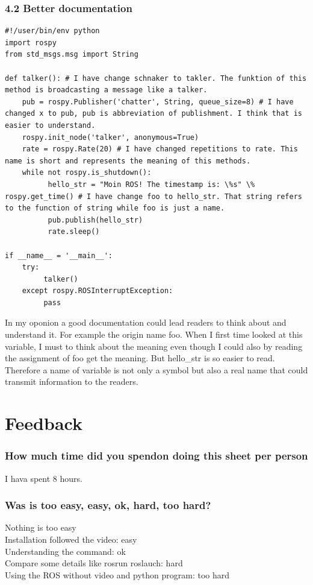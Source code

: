 \documentclass{ROS}
\begin{document}
\subsubsection*{4.2 Better documentation}
\begin{lstlisting}[firstnumber=1]
#!/user/bin/env python 
import rospy 
from std_msgs.msg import String

def talker(): # I have change schnaker to takler. The funktion of this method is broadcasting a message like a talker.
    pub = rospy.Publisher('chatter', String, queue_size=8) # I have changed x to pub, pub is abbreviation of publishment. I think that is easier to understand.
    rospy.init_node('talker', anonymous=True)
    rate = rospy.Rate(20) # I have changed repetitions to rate. This name is short and represents the meaning of this methods.
    while not rospy.is_shutdown():
          hello_str = "Moin ROS! The timestamp is: \%s" \% rospy.get_time() # I have change foo to hello_str. That string refers to the function of string while foo is just a name.  
          pub.publish(hello_str)
          rate.sleep()

if __name__ = '__main__':
    try:
         talker()
    except rospy.ROSInterruptException:
         pass
\end{lstlisting}
In my oponion a good documentation could lead readers to think about and understand it. For example the origin name foo. When I first time looked at this variable, I must to think about the meaning even though I could also by reading the assignment of foo get the meaning. But hello\_str is so easier to read. Therefore a name of variable is not only a symbol but also a real name that could transmit information to the readers.\\
\section*{Feedback}
\subsubsection*{How much time did you spendon doing this sheet per person}
I hava spent 8 hours.
\subsubsection*{Was is too easy, easy, ok, hard, too hard?}
Nothing is too easy\\
Installation followed the video: easy\\
Understanding the command: ok\\
Compare some details like rosrun roslauch: hard\\
Using the ROS without video and python program: too hard\\
\end{document}
